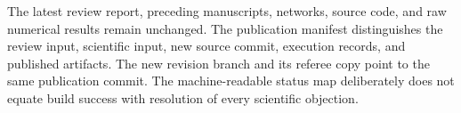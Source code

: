 \documentclass[ecta]{econsocart}
\theoremstyle{remark}
\begin{document}
The latest review report, preceding manuscripts, networks, source code, and raw numerical results remain unchanged. The publication manifest distinguishes the review input, scientific input, new source commit, execution records, and published artifacts. The new revision branch and its referee copy point to the same publication commit. The machine-readable status map deliberately does not equate build success with resolution of every scientific objection.
\end{document}

